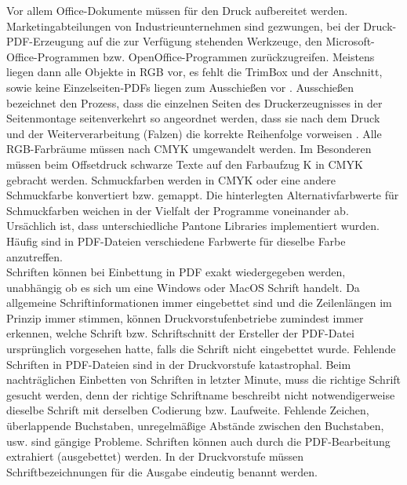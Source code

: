 Vor allem Office-Dokumente müssen für den Druck aufbereitet werden. Marketingabteilungen von Industrieunternehmen sind gezwungen, bei der Druck-PDF-Erzeugung auf die zur Verfügung stehenden Werkzeuge, den Microsoft-Office-Programmen bzw. OpenOffice-Programmen zurückzugreifen. Meistens liegen dann alle Objekte in RGB vor, es fehlt die TrimBox und der Anschnitt, sowie keine Einzelseiten-PDFs liegen zum Ausschießen vor \cite{schneeberger}. Ausschießen bezeichnet den Prozess, dass die einzelnen Seiten des Druckerzeugnisses in der Seitenmontage seitenverkehrt so angeordnet werden, dass sie nach dem Druck und der Weiterverarbeitung (Falzen) die korrekte Reihenfolge vorweisen \cite{kompendium}. Alle RGB-Farbräume müssen nach CMYK umgewandelt werden. Im Besonderen müssen beim Offsetdruck schwarze Texte auf den Farbaufzug K in CMYK gebracht werden. Schmuckfarben werden in CMYK oder eine andere Schmuckfarbe konvertiert bzw. gemappt. Die hinterlegten Alternativfarbwerte für Schmuckfarben weichen in der Vielfalt der Programme voneinander ab. Ursächlich ist, dass unterschiedliche Pantone Libraries implementiert wurden. Häufig sind in PDF-Dateien verschiedene Farbwerte für dieselbe Farbe anzutreffen. \\
Schriften können bei Einbettung in PDF exakt wiedergegeben werden, unabhängig ob es sich um eine Windows oder MacOS Schrift handelt. Da allgemeine Schriftinformationen immer eingebettet sind und die Zeilenlängen im Prinzip immer stimmen, können Druckvorstufenbetriebe zumindest immer erkennen, welche Schrift bzw. Schriftschnitt der Ersteller der PDF-Datei ursprünglich vorgesehen hatte, falls die Schrift nicht eingebettet wurde. Fehlende Schriften in PDF-Dateien sind in der Druckvorstufe katastrophal. Beim nachträglichen Einbetten von Schriften in letzter Minute, muss die richtige Schrift gesucht werden, denn der richtige Schriftname beschreibt nicht notwendigerweise dieselbe Schrift mit derselben Codierung bzw. Laufweite. Fehlende Zeichen, überlappende Buchstaben, unregelmäßige Abstände zwischen den Buchstaben, usw. sind gängige Probleme. Schriften können auch durch die PDF-Bearbeitung extrahiert (ausgebettet) werden. In der Druckvorstufe müssen Schriftbezeichnungen für die Ausgabe eindeutig benannt werden. \\

